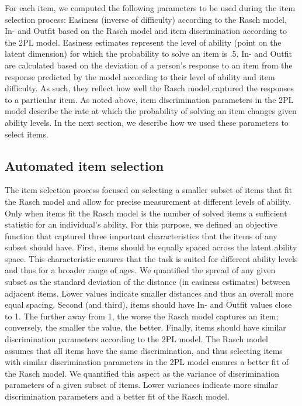 \documentclass[
  man,floatsintext]{apa6}
\begin{document}
For each item, we computed the following parameters to be used during the item selection process: Easiness (inverse of difficulty) according to the Rasch model, In- and Outfit based on the Rasch model and item discrimination according to the 2PL model. Easiness estimates represent the level of ability (point on the latent dimension) for which the probability to solve an item is .5. In- and Outfit are calculated based on the deviation of a person's response to an item from the response predicted by the model according to their level of ability and item difficulty. As such, they reflect how well the Rasch model captured the responses to a particular item. As noted above, item discrimination parameters in the 2PL model describe the rate at which the probability of solving an item changes given ability levels. In the next section, we describe how we used these parameters to select items.

\hypertarget{automated-item-selection}{%
\subsection{Automated item selection}\label{automated-item-selection}}

The item selection process focused on selecting a smaller subset of items that fit the Rasch model and allow for precise measurement at different levels of ability. Only when items fit the Rasch model is the number of solved items a sufficient statistic for an individual's ability. For this purpose, we defined an objective function that captured three important characteristics that the items of any subset should have. First, items should be equally spaced across the latent ability space. This characteristic ensures that the task is suited for different ability levels and thus for a broader range of ages. We quantified the spread of any given subset as the standard deviation of the distance (in easiness estimates) between adjacent items. Lower values indicate smaller distances and thus an overall more equal spacing. Second (and third), items should have In- and Outfit values close to 1. The further away from 1, the worse the Rasch model captures an item; conversely, the smaller the value, the better. Finally, items should have similar discrimination parameters according to the 2PL model. The Rasch model assumes that all items have the same discrimination, and thus selecting items with similar discrimination parameters in the 2PL model ensures a better fit of the Rasch model. We quantified this aspect as the variance of discrimination parameters of a given subset of items. Lower variances indicate more similar discrimination parameters and a better fit of the Rasch model.
\end{document}
